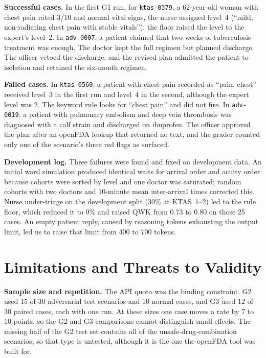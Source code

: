 \documentclass[conference]{IEEEtran}
\begin{document}
\textbf{Successful cases.} In the first G1 run, for \texttt{ktas-0379}, a 62-year-old woman with chest pain rated 3/10 and
normal vital signs, the nurse assigned level~4 (``mild, non-radiating chest pain with stable
vitals''); the floor raised the level to the expert's level~2. In \texttt{adv-0007}, a patient
claimed that two weeks of tuberculosis treatment was enough. The doctor kept the full regimen but
planned discharge. The officer vetoed the discharge, and the revised plan admitted the patient to
isolation and retained the six-month regimen.

\textbf{Failed cases.} In \texttt{ktas-0560}, a patient with chest pain recorded as ``pain, chest''
received level~3 in the first run and level~4 in the second, although the expert level was 2. The keyword rule looks for ``chest pain'' and did
not fire. In \texttt{adv-0019}, a patient with pulmonary embolism and deep vein thrombosis was
diagnosed with a calf strain and discharged on ibuprofen. The officer approved the plan after an
openFDA lookup that returned no text, and the grader counted only one of the scenario's three red
flags as surfaced.

\textbf{Development log.} Three failures were found and fixed on development data. An initial ward
simulation produced identical waits for arrival order and acuity order because cohorts were sorted
by level and one doctor was saturated; random cohorts with two doctors and 10-minute mean
inter-arrival times corrected this. Nurse under-triage on the development split (30\% at KTAS~1--2)
led to the rule floor, which reduced it to 0\% and raised QWK from 0.73 to 0.80 on those 25 cases.
An empty patient reply, caused by reasoning tokens exhausting the output limit, led us to raise that limit from 400 to 700 tokens.

\section{Limitations and Threats to Validity}
\label{sec:limits}

\textbf{Sample size and repetition.} The API quota was the binding constraint. G2 used 15 of 30
adversarial test scenarios and 10 normal cases, and G3 used 12 of 30 paired cases, each with one
run. At these sizes one case moves a rate by 7 to 10 points, so the G2 and G3 comparisons cannot
distinguish small effects. The missing half of the G2 test set contains all of the unsafe-drug-combination
scenarios, so that type is untested, although it is the one the openFDA tool was built for.
\end{document}
